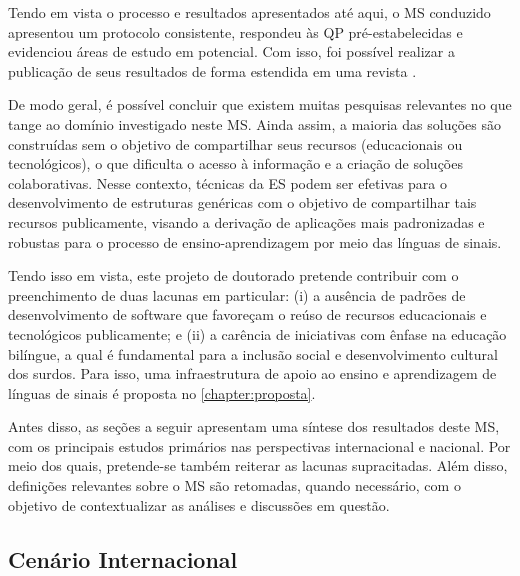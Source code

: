 Tendo em vista o processo e resultados apresentados até aqui, o MS conduzido apresentou um protocolo consistente, respondeu às QP pré-estabelecidas e evidenciou áreas de estudo em potencial. Com isso, foi possível realizar a publicação de seus resultados de forma estendida em uma revista \cite{FalvoJr2020_RENOTE}.

De modo geral, é possível concluir que existem muitas pesquisas relevantes no que tange ao domínio investigado neste MS. Ainda assim, a maioria das soluções são construídas sem o objetivo de compartilhar seus recursos (educacionais ou tecnológicos), o que dificulta o acesso à informação e a criação de soluções colaborativas. Nesse contexto, técnicas da ES podem ser efetivas para o desenvolvimento de estruturas genéricas com o objetivo de compartilhar tais recursos publicamente, visando a derivação de aplicações mais padronizadas e robustas para o processo de ensino-aprendizagem por meio das línguas de sinais. %


Tendo isso em vista, este projeto de doutorado pretende contribuir com o preenchimento de duas lacunas em particular: (i) a ausência de padrões de desenvolvimento de software que favoreçam o reúso de recursos educacionais e tecnológicos publicamente; e (ii) a carência de iniciativas com ênfase na educação bilíngue, a qual é fundamental para a inclusão social e desenvolvimento cultural dos surdos. Para isso, uma infraestrutura de apoio ao ensino e aprendizagem de línguas de sinais é proposta no \autoref{chapter:proposta}.

Antes disso, as seções a seguir apresentam uma síntese dos resultados deste MS, com os principais estudos primários nas perspectivas internacional e nacional. Por meio dos quais, pretende-se também reiterar as lacunas supracitadas. Além disso, definições relevantes sobre o MS são retomadas, quando necessário, com o objetivo de contextualizar as análises e discussões em questão.

\subsection{Cenário Internacional}
\label{ms:cenario-internacional}

